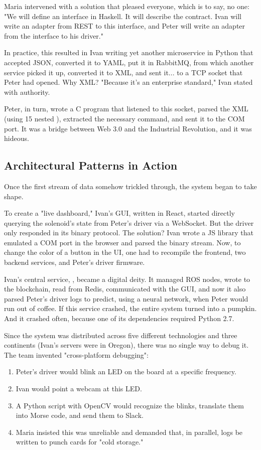 Maria intervened with a solution that pleased everyone, which is to say, no one: "We will define an  interface in Haskell. It will describe the contract. Ivan will write an adapter from REST to this interface, and Peter will write an adapter from the interface to his driver."

In practice, this resulted in Ivan writing yet another microservice in Python that accepted JSON, converted it to YAML, put it in RabbitMQ, from which another service picked it up, converted it to XML, and sent it... to a TCP socket that Peter had opened. Why XML? "Because it's an enterprise standard," Ivan stated with authority.

Peter, in turn, wrote a C program that listened to this socket, parsed the XML (using 15 nested ), extracted the necessary command, and sent it to the COM port. It was a bridge between Web 3.0 and the Industrial Revolution, and it was hideous.

\subsection*{Architectural Patterns in Action}

Once the first stream of data somehow trickled through, the  system began to take shape.

To create a "live dashboard," Ivan's GUI, written in React, started directly querying the solenoid's state from Peter's driver via a WebSocket. But the driver only responded in its binary protocol. The solution? Ivan wrote a JS library that emulated a COM port in the browser and parsed the binary stream. Now, to change the color of a button in the UI, one had to recompile the frontend, two backend services, and Peter's driver firmware.

Ivan's central service, , became a digital deity. It managed ROS nodes, wrote to the blockchain, read from Redis, communicated with the GUI, and now it also parsed Peter's driver logs to predict, using a neural network, when Peter would run out of coffee. If this service crashed, the entire system turned into a pumpkin. And it crashed often, because one of its dependencies required Python 2.7.


Since the system was distributed across five different technologies and three continents (Ivan's servers were in Oregon), there was no single way to debug it. The team invented "cross-platform debugging":
\begin{enumerate}
    \item Peter's driver would blink an LED on the board at a specific frequency.
    \item Ivan would point a webcam at this LED.
    \item A Python script with OpenCV would recognize the blinks, translate them into Morse code, and send them to Slack.
    \item Maria insisted this was unreliable and demanded that, in parallel, logs be written to punch cards for "cold storage."
\end{enumerate}


